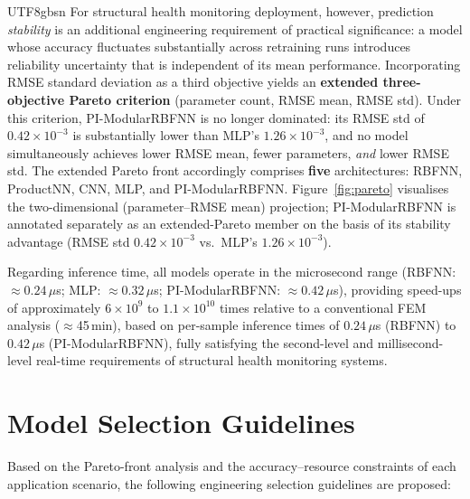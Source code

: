 \documentclass[a4paper,12pt]{report}
\begin{document}
\begin{CJK}{UTF8}{gbsn}
For structural health monitoring deployment, however, prediction \emph{stability} is an
additional engineering requirement of practical significance: a model whose accuracy
fluctuates substantially across retraining runs introduces reliability uncertainty that
is independent of its mean performance. Incorporating RMSE standard deviation as a third
objective yields an \textbf{extended three-objective Pareto criterion} (parameter count,
RMSE mean, RMSE std). Under this criterion, PI-ModularRBFNN is no longer dominated: its
RMSE std of $0.42\times10^{-3}$ is substantially lower than MLP's $1.26\times10^{-3}$,
and no model simultaneously achieves lower RMSE mean, fewer parameters, \emph{and} lower
RMSE std. The extended Pareto front accordingly comprises \textbf{five} architectures:
RBFNN, ProductNN, CNN, MLP, and PI-ModularRBFNN. Figure~\ref{fig:pareto} visualises the
two-dimensional (parameter--RMSE mean) projection; PI-ModularRBFNN is annotated
separately as an extended-Pareto member on the basis of its stability advantage
(RMSE std $0.42\times10^{-3}$ vs.\ MLP's $1.26\times10^{-3}$).

Regarding inference time, all models operate in the microsecond range
(RBFNN: $\approx 0.24\,\mu$s; MLP: $\approx 0.32\,\mu$s; PI-ModularRBFNN: $\approx 0.42\,\mu$s),
providing speed-ups of approximately $6\times10^{9}$ to $1.1\times10^{10}$ times
relative to a conventional FEM analysis ($\approx$45\,min), based on per-sample inference
times of $0.24\,\mu$s (RBFNN) to $0.42\,\mu$s (PI-ModularRBFNN),
fully satisfying the second-level and millisecond-level real-time requirements of
structural health monitoring systems.

\section{Model Selection Guidelines}
\label{sec:selection}

Based on the Pareto-front analysis and the accuracy--resource constraints of each
application scenario, the following engineering selection guidelines are proposed:


\end{CJK}
\end{document}
